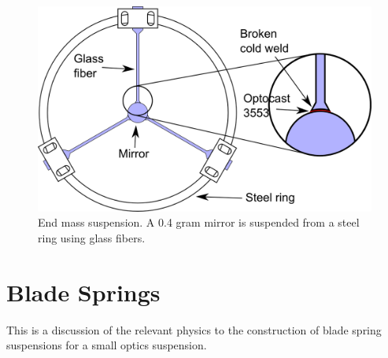 \begin{figure}[htbp]
	\centering
		\includegraphics[width=.9\textwidth]{figures/suspensions/smallmass2.png}
	\caption[End mass suspension]{End mass suspension. A 0.4 gram mirror is suspended from a steel ring using glass fibers.}
	\label{fig:smallmassdiagram}
\end{figure}




\section{Blade Springs}


This is a discussion of the relevant physics to the construction of blade spring suspensions for a small optics suspension.

